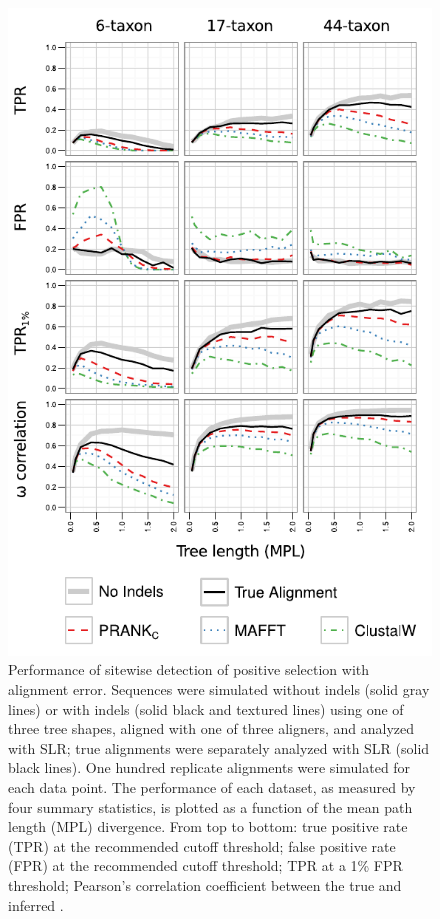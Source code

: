 \begin{figure}[t!]
\centering
\includegraphics[scale=0.9]{Figs/fig3.pdf}
\caption{Performance of sitewise detection of positive selection with
  alignment error. Sequences were simulated without indels (solid gray
  lines) or with indels (solid black and textured lines) using one of
  three tree shapes, aligned with one of three aligners, and analyzed
  with SLR; true alignments were separately analyzed with SLR (solid
  black lines). One hundred replicate alignments were simulated for
  each data point. The performance of each dataset, as measured by
  four summary statistics, is plotted as a function of the mean path
  length (MPL) divergence. From top to bottom: true positive rate
  (TPR) at the recommended cutoff threshold; false positive rate (FPR)
  at the recommended cutoff threshold; TPR at a 1\% FPR threshold;
  Pearson's correlation coefficient between the true and inferred
  \omg.}
\label{fig_3}
\end{figure}

